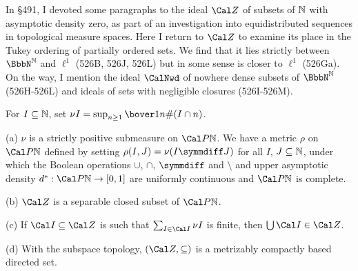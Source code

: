
\def\chaptername{Cardinal functions of measure theory}
\def\sectionname{Asymptotic density zero}


In \S491, I devoted some paragraphs to the ideal $\Cal Z$ of subsets
of $\Bbb N$ with asymptotic density zero, as part of an investigation
into equidistributed sequences
in topological measure spaces.   Here I return to $\Cal Z$ to examine
its place in the Tukey ordering of partially ordered sets.   We find
that it lies strictly between
$\NN$ and $\ell^1$ (526B, 526J, 526L)
but in some sense is closer to $\ell^1$
(526Ga).   On the way, I mention the ideal $\CalNwd$
of nowhere dense subsets of $\NN$
(526H-526L) %
and ideals of sets with negligible closures
(526I-526M). %

 For $I\subseteq\Bbb N$, set
$\nu I=\sup_{n\ge 1}\bover1n\#(I\cap n)$.

(a) $\nu$ is a strictly positive submeasure on $\Cal P\Bbb N$.   We have a
metric $\rho$ on $\Cal P\Bbb N$
defined by setting $\rho(I,J)=\nu(I\symmdiff J)$ for all $I$,
$J\subseteq\Bbb N$, under which the Boolean operations $\cup$, $\cap$,
$\symmdiff$ and $\setminus$ and upper asymptotic density
$d^*:\Cal P\Bbb N\to[0,1]$ are uniformly continuous and
$\Cal P\Bbb N$ is complete.

(b) $\Cal Z$ is a separable closed subset of $\Cal P\Bbb N$.

(c) If $\Cal I\subseteq\Cal Z$ is such that $\sum_{I\in\Cal I}\nu I$ is
finite, then $\bigcup\Cal I\in\Cal Z$.

(d) With the subspace topology, $(\Cal Z,\subseteq)$
is a metrizably compactly based directed set.

